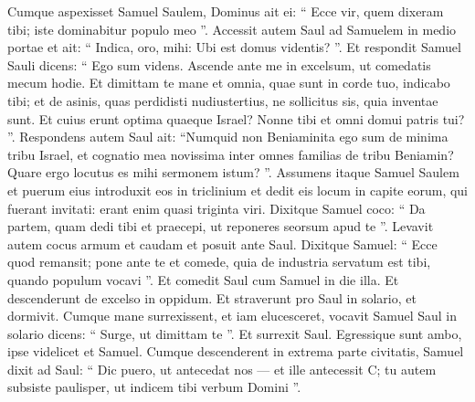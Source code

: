 \begin{biblechapter}
\begin{biblechapter}
\begin{biblechapter}
\begin{biblechapter}
\begin{biblechapter}
\begin{biblechapter}
\begin{biblechapter}
\begin{biblechapter}
\begin{biblechapter}
\verse Cumque aspexisset Samuel Saulem, Dominus ait ei: “ Ecce vir, quem dixeram tibi; iste dominabitur populo meo ”.
 \verse Accessit autem Saul ad Samuelem in medio portae et ait: “ Indica, oro, mihi: Ubi est domus videntis? ”. 
\verse Et respondit Samuel Sauli dicens: “ Ego sum videns. Ascende ante me in excelsum, ut comedatis mecum hodie. Et dimittam te mane et omnia, quae sunt in corde tuo, indicabo tibi; 
\verse et de asinis, quas perdidisti nudiustertius, ne sollicitus sis, quia inventae sunt. Et cuius erunt optima quaeque Israel? Nonne tibi et omni domui patris tui? ”. 
\verse Respondens autem Saul ait: “Numquid non Beniaminita ego sum de minima tribu Israel, et cognatio mea novissima inter omnes familias de tribu Beniamin? Quare ergo locutus es mihi sermonem istum? ”.
 \verse Assumens itaque Samuel Saulem et puerum eius introduxit eos in triclinium et dedit eis locum in capite eorum, qui fuerant invitati: erant enim quasi triginta viri. 
\verse Dixitque Samuel coco: “ Da partem, quam dedi tibi et praecepi, ut reponeres seorsum apud te ”. 
\verse Levavit autem cocus armum et caudam et posuit ante Saul. Dixitque Samuel: “ Ecce quod remansit; pone ante te et comede, quia de industria servatum est tibi, quando populum vocavi ”. Et comedit Saul cum Samuel in die illa.
 \verse Et descenderunt de excelso in oppidum. Et straverunt pro Saul in solario, et dormivit.
 \verse Cumque mane surrexissent, et iam elucesceret, vocavit Samuel Saul in solario dicens: “ Surge, ut dimittam te ”. Et surrexit Saul. Egressique sunt ambo, ipse videlicet et Samuel. 
\verse Cumque descenderent in extrema parte civitatis, Samuel dixit ad Saul: “ Dic puero, ut antecedat nos — et ille antecessit C; tu autem subsiste paulisper, ut indicem tibi verbum Domini ”.
 

\end{biblechapter}
\end{biblechapter}
\end{biblechapter}
\end{biblechapter}
\end{biblechapter}
\end{biblechapter}
\end{biblechapter}
\end{biblechapter}
\end{biblechapter}
